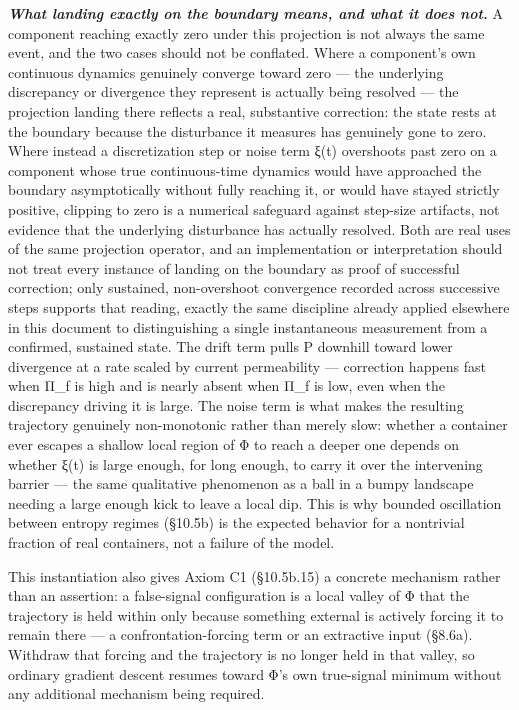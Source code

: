\documentclass[
]{article}
\begin{document}
\emph{\textbf{What landing exactly on the boundary means, and what it
does not.}} A component reaching exactly zero under this projection is
not always the same event, and the two cases should not be conflated.
Where a component's own continuous dynamics genuinely converge toward
zero --- the underlying discrepancy or divergence they represent is
actually being resolved --- the projection landing there reflects a
real, substantive correction: the state rests at the boundary because
the disturbance it measures has genuinely gone to zero. Where instead a
discretization step or noise term ξ(t) overshoots past zero on a
component whose true continuous-time dynamics would have approached the
boundary asymptotically without fully reaching it, or would have stayed
strictly positive, clipping to zero is a numerical safeguard against
step-size artifacts, not evidence that the underlying disturbance has
actually resolved. Both are real uses of the same projection operator,
and an implementation or interpretation should not treat every instance
of landing on the boundary as proof of successful correction; only
sustained, non-overshoot convergence recorded across successive steps
supports that reading, exactly the same discipline already applied
elsewhere in this document to distinguishing a single instantaneous
measurement from a confirmed, sustained state. The drift term pulls P
downhill toward lower divergence at a rate scaled by current
permeability --- correction happens fast when Π\_f is high and is nearly
absent when Π\_f is low, even when the discrepancy driving it is large.
The noise term is what makes the resulting trajectory genuinely
non-monotonic rather than merely slow: whether a container ever escapes
a shallow local region of Φ to reach a deeper one depends on whether
ξ(t) is large enough, for long enough, to carry it over the intervening
barrier --- the same qualitative phenomenon as a ball in a bumpy
landscape needing a large enough kick to leave a local dip. This is why
bounded oscillation between entropy regimes (§10.5b) is the expected
behavior for a nontrivial fraction of real containers, not a failure of
the model.

This instantiation also gives Axiom C1 (§10.5b.15) a concrete mechanism
rather than an assertion: a false-signal configuration is a local valley
of Φ that the trajectory is held within only because something external
is actively forcing it to remain there --- a confrontation-forcing term
or an extractive input (§8.6a). Withdraw that forcing and the trajectory
is no longer held in that valley, so ordinary gradient descent resumes
toward Φ's own true-signal minimum without any additional mechanism
being required.
\end{document}
